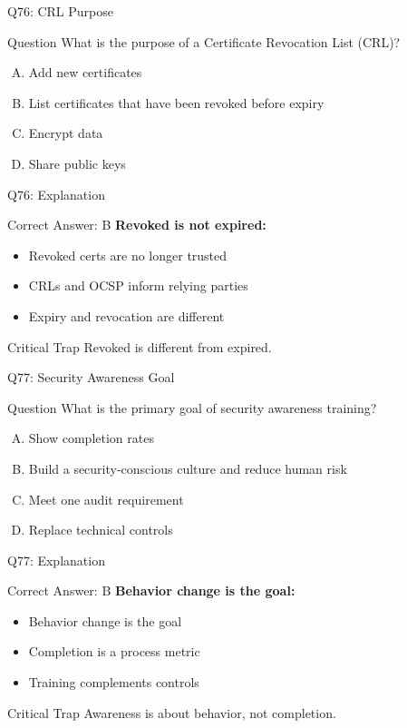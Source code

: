 \documentclass{beamer}
\begin{document}
	\begin{frame}{Q76: CRL Purpose}
		\begin{block}{Question}
			What is the purpose of a Certificate Revocation List (CRL)?
		\end{block}
		\begin{enumerate}[(A)]
			\item Add new certificates
			\item List certificates that have been revoked before expiry
			\item Encrypt data
			\item Share public keys
		\end{enumerate}
	\end{frame}
	
	\begin{frame}{Q76: Explanation}
		\begin{block}{Correct Answer: B}
			\textbf{Revoked is not expired:}
			\begin{itemize}
				\item Revoked certs are no longer trusted
				\item CRLs and OCSP inform relying parties
				\item Expiry and revocation are different
			\end{itemize}
		\end{block}
		\begin{alertblock}{Critical Trap}
			Revoked is different from expired.
		\end{alertblock}
	\end{frame}
	
	\begin{frame}{Q77: Security Awareness Goal}
		\begin{block}{Question}
			What is the primary goal of security awareness training?
		\end{block}
		\begin{enumerate}[(A)]
			\item Show completion rates
			\item Build a security-conscious culture and reduce human risk
			\item Meet one audit requirement
			\item Replace technical controls
		\end{enumerate}
	\end{frame}
	
	\begin{frame}{Q77: Explanation}
		\begin{block}{Correct Answer: B}
			\textbf{Behavior change is the goal:}
			\begin{itemize}
				\item Behavior change is the goal
				\item Completion is a process metric
				\item Training complements controls
			\end{itemize}
		\end{block}
		\begin{alertblock}{Critical Trap}
			Awareness is about behavior, not completion.
		\end{alertblock}
	\end{frame}
	
\end{document}
